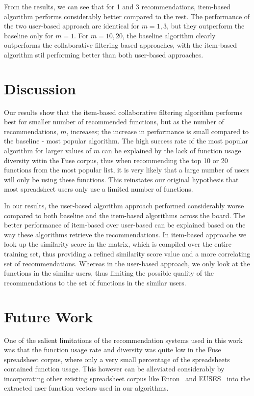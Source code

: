 \documentclass{article} %
\begin{document}
From the results, we can see that for 1 and 3 recommendations, item-based algorithm performs considerably better compared to the rest. The performance of the two user-based approach are identical for $m=1,3$, but they outperform the baseline only for $m=1$. For $m=10,20$, the baseline algorithm clearly outperforms the collaborative filtering based approaches, with the item-based algorithm stil performing better than both user-based approaches.

\section{Discussion}
Our results show that the item-based collaborative filtering algorithm performs best for smaller number of recommended functions, but as the number of recommendations, $m$, increases; the increase in performance is small compared to the baseline - most popular algorithm. The high success rate of the most popular algorithm for larger values of $m$ can be explained by the lack of function usage diversity witin the Fuse corpus, thus when recommending the top 10 or 20 functions from the most popular list, it is very likely that a large number of users will only be using these functions. This reinstates our original hypothesis that most spreadsheet users only use a limited number of functions.

In our results, the user-based algorithm approach performed considerably worse compared to both baseline and the item-based algorithms across the board. The better performance of item-based over user-based can be explained based on the way these algorithms retrieve the recommendations. In item-based approache we look up the similarity score in the matrix, which is compiled over the entire training set, thus providing a refined similarity score value and a more correlating set of recommendations. Whereas in the user-based approach, we only look at the functions in the similar users, thus limiting the possible quality of the recommendations to the set of functions in the similar users.

\section{Future Work}
One of the salient limitations of the recommendation systems used in this work was that the function usage rate and diversity was quite low in the Fuse spreadsheet corpus, where only a very small percentage of the spreadsheets contained function usage. This however can be alleviated considerably by incorporating other existing spreadsheet corpus like Enron~\cite{hermans2014enron} and EUSES~\cite{fisher2005euses} into the extracted user function vectors used in our algorithms.
\end{document}
